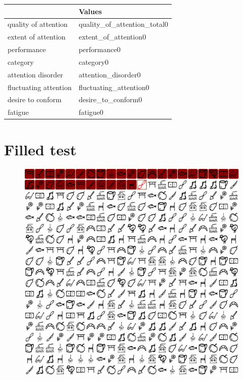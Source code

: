 \documentclass[12pt,a4paper]{article}
\begin{document}
\begin{table}[htbp]
\footnotesize

\begin{tabulary}{\linewidth}{|L|L|}
\hline
 &  Values  \\
\hline
quality of attention & quality_of_attention_total0 \\
\hline
extent of attention & extent_of_attention0 \\
\hline
performance & performance0  \\
\hline
category & category0  \\
\hline
attention disorder & attention_disorder0  \\
\hline
fluctuating attention & fluctuating_attention0  \\
\hline
desire to conform & desire_to_conform0  \\
\hline
fatigue & fatigue0  \\
\hline
\end{tabulary}
\label{tab:team}
\end{table}%

\textblockorigin{-18pt}{-2pt}

\newpage

\section*{Filled test}


\begin{figure}[!h]
    \centering
    \includegraphics[scale=0.4]{kitoltott.png}
\end{figure}
\end{document}
